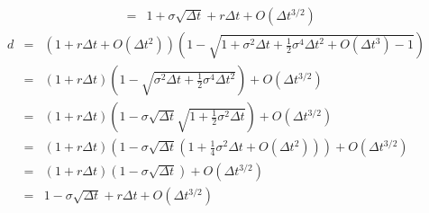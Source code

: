 \documentclass[a4paper]{article}
\def\dd{\Delta}
\def\lb{\left(}
\def\rb{\right)}
\begin{document}
\begin{enumerate}
\begin{eqnarray*}
&=&1+\sigma\sqrt{\dd t}+r\dd t+O(\dd t^{3/2})
\end{eqnarray*}
\begin{eqnarray*}
d&=&\lb 1+r\dd t+O(\dd t^2)\rb\lb 1-\sqrt{1+\sigma^2\dd t+\frac{1}{2}\sigma^4\dd t^2+O(\dd t^3)-1}\rb\\
&=&\lb 1+r\dd t\rb\lb 1-\sqrt{\sigma^2\dd t+\frac{1}{2}\sigma^4\dd t^2}\rb+O(\dd t^{3/2})\\
&=&\lb 1+r\dd t\rb\lb 1-\sigma\sqrt{\dd t}\sqrt{1+\frac{1}{2}\sigma^2\dd t}\rb+O(\dd t^{3/2})\\
&=&(1+r\dd t)\lb 1-\sigma\sqrt{\dd t}\lb 1+\frac{1}{4}\sigma^2\dd t+O(\dd t^2)\rb\rb+O(\dd t^{3/2})\\
&=&(1+r\dd t)(1-\sigma\sqrt{\dd t})+O(\dd t^{3/2})\\
&=&1-\sigma\sqrt{\dd t}+r\dd t+O(\dd t^{3/2})
\end{eqnarray*}

\pagebreak


\end{enumerate}
\end{document}
